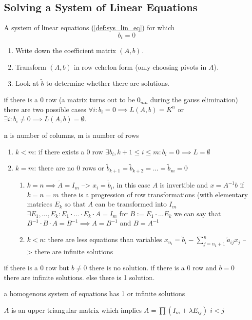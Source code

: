 \subsection{Solving a System of Linear Equations}
\begin{definition}
   A system of linear equations (\ref{def:sys_lin_eq}) for which
   \[b_i = 0\]
\end{definition}

\begin{enumerate}
\item Write down the coefficient matrix \((A, b)\).
\item Transform \((A, b)\) in row echelon form (only choosing pivots in \(A\)).
\item Look at \(\tilde{b}\) to determine whether there are solutions.
\end{enumerate}

if there is a 0 row (a matrix turns out to be \(0_{mn}\) during the gauss elimination) there are two possible cases \(\forall i: b_i = 0 \implies L(A, b) = K^n\) or \(\exists i: b_i \neq 0 \implies L(A, b) = \emptyset\).

n is number of columns, m is number of rows
\begin{enumerate}
\item \(k < m\): if there exists a 0 row \(\exists b_i, k + 1 \leq i \leq m: b_i = 0 \implies L = \emptyset\)
\item \(k = m\): there are no 0 rows or \(\tilde{b}_{k+1} = \tilde{b}_{k+2} = \ldots = \tilde{b}_m = 0\)
\begin{enumerate}
\item \(k = n \implies \tilde{A} = I_m\) --> \(x_i = \tilde{b}_i\), in this case \(A\) is invertible and \(x = A^{-1} b\)
if \(k = n = m\) there is a progression of row transformations (with elementary matrices \(E_k\) so that \(A\) can be transformed into \(I_m\) \(\exists E_1, \ldots, E_k: E_1 \cdot \ldots \cdot E_k \cdot A = I_m\)
for \(B := E_1 \cdot \ldots E_k\) we can say that \(B^{-1} \cdot B \cdot A = B^{-1} \implies A = B^{-1}\)
and \(B = A^{-1}\)

\item \(k < n\): there are less equations than variables \(x_{n_i} = \tilde{b}_i - \sum_{j = n_1 + 1}^n \tilde{a}_{ij} x_j\) --> there are infinite solutions
\end{enumerate}
\end{enumerate}

if there is a 0 row but \(b \neq 0\) there is no solution.
if there is a 0 row and \(b = 0\) there are infinite solutions.
else there is 1 solution.

a homogenous system of equations has 1 or infinite solutions

\(A\) is an upper triangular matrix which implies \(A = \prod (I_m + \lambda E_{ij})\) \(i < j\)
